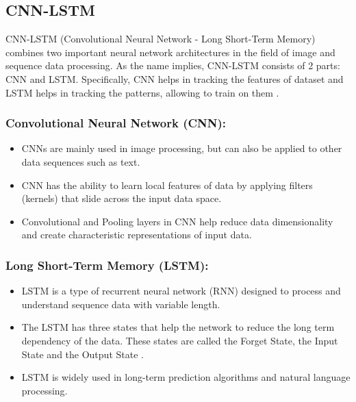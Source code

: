 \documentclass[conference]{IEEEtran}
\begin{document}
\subsection{CNN-LSTM}
CNN-LSTM (Convolutional Neural Network - Long Short-Term Memory) combines two important neural network architectures in the field of image and sequence data processing.
As the name implies, CNN-LSTM consists of 2 parts: CNN and LSTM. Specifically, CNN helps in tracking the features of dataset and LSTM helps in tracking the patterns, allowing to train on them \cite{PredictStockCNNLSTM}. \\
\subsubsection{Convolutional Neural Network (CNN):}
\begin{itemize}
    \item CNNs are mainly used in image processing, but can also be applied to other data sequences such as text.
    \item CNN has the ability to learn local features of data by applying filters (kernels) that slide across the input data space.
    \item Convolutional and Pooling layers in CNN help reduce data dimensionality and create characteristic representations of input data.
\end{itemize}

\subsubsection{Long Short-Term Memory (LSTM):}
\begin{itemize}
    \item LSTM is a type of recurrent neural network (RNN) designed to process and understand sequence data with variable length.
    \item The LSTM has three states that help the network to reduce the long term dependency of the data. These states are called the Forget State, the Input State and the Output State \cite{ComparasionCNNLSTM}.
    \item LSTM is widely used in long-term prediction algorithms and natural language processing.
\end{itemize}
\end{document}

